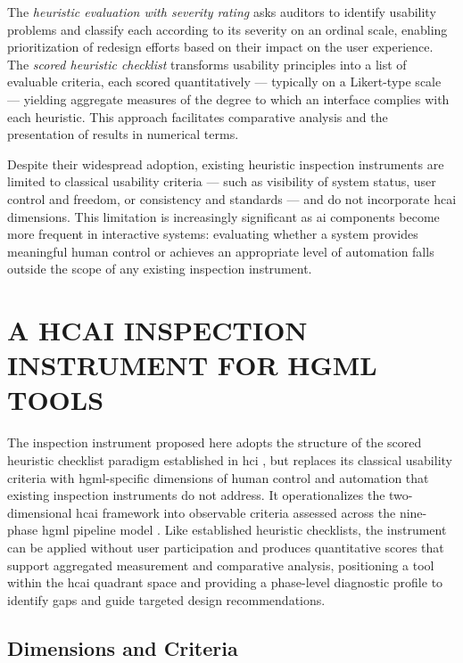 \documentclass[a4paper,twoside]{article}
\begin{document}
The \emph{heuristic 
evaluation with severity rating} asks auditors 
to identify usability problems and classify each according to its severity on 
an ordinal scale, enabling prioritization of redesign efforts based on their 
impact on the user experience. The \emph{scored heuristic checklist} 
transforms usability principles into a list of evaluable criteria, each 
scored quantitatively --- typically on a Likert-type scale --- yielding 
aggregate measures of the degree to which an interface complies with each 
heuristic. This approach facilitates comparative analysis and the presentation 
of results in numerical terms.

Despite their widespread adoption, existing heuristic inspection instruments 
are limited to classical usability criteria --- such as visibility of system 
status, user control and freedom, or consistency and standards --- and do not 
incorporate \gls{hcai} dimensions. This limitation is increasingly significant 
as \gls{ai} components become more frequent in interactive systems: evaluating 
whether a system provides meaningful human control or achieves an appropriate 
level of automation falls outside the scope of any existing inspection 
instrument.


\section{\uppercase{A HCAI Inspection Instrument for HGML Tools}}
\label{sec:hcai_inspection_instrument}

The inspection instrument proposed here adopts the structure of the scored heuristic checklist paradigm established in \gls{hci} \cite{nielsen1994usability}, but replaces its classical usability criteria with \gls{hgml}-specific dimensions of human control and automation that existing inspection instruments do not address. It operationalizes the two-dimensional \gls{hcai} framework \cite{shneiderman2022human} into observable criteria assessed across the nine-phase \gls{hgml} pipeline model \cite{gil2019towards}. Like established heuristic checklists, the instrument can be applied without user participation and produces quantitative scores that support aggregated measurement and comparative analysis, positioning a tool within the \gls{hcai} quadrant space and providing a phase-level diagnostic profile to identify gaps and guide targeted design recommendations.

\subsection{Dimensions and Criteria}
\label{subsec:dimensions}
\end{document}
